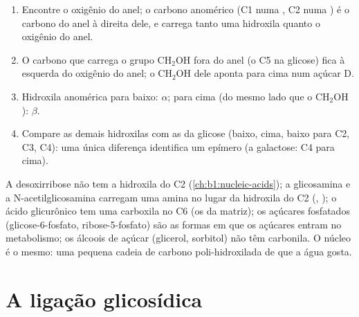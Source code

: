 \begin{method}\label{met:b1:carbohydrates:haworth}
\begin{enumerate}
  \item Encontre o oxigênio do anel; o carbono anomérico (C1 numa
        , C2 numa ) é o carbono do anel à direita dele, e
        carrega tanto uma hidroxila quanto o oxigênio do anel.
  \item O carbono que carrega o grupo $\mathrm{CH_2OH}$ fora do anel (o
        C5 na glicose) fica à esquerda do oxigênio do anel; o
        $\mathrm{CH_2OH}$ dele aponta para cima num açúcar D.
  \item Hidroxila anomérica para baixo: $\alpha$; para cima (do mesmo
        lado que o $\mathrm{CH_2OH}$): $\beta$.
  \item Compare as demais hidroxilas com as da glicose (baixo, cima,
        baixo para C2, C3, C4): uma única diferença identifica um
        epímero (a galactose: C4 para cima).
\end{enumerate}
\end{method}

\begin{example}\label{ex:b1:carbohydrates:derivatives}
A desoxirribose não tem a hidroxila do C2
(\cref{ch:b1:nucleic-acids}); a glicosamina e a
N-acetilglicosamina carregam uma amina no lugar da hidroxila do C2
(, ); o ácido glicurônico tem uma carboxila no C6
(os  da matriz); os açúcares fosfatados
(glicose-6-fosfato, ribose-5-fosfato) são as formas em que os açúcares
entram no metabolismo; os álcoois de açúcar (glicerol, sorbitol) não têm
carbonila. O núcleo é o mesmo: uma pequena cadeia de carbono
poli-hidroxilada de que a água gosta.
\end{example}

\section{A ligação glicosídica}

